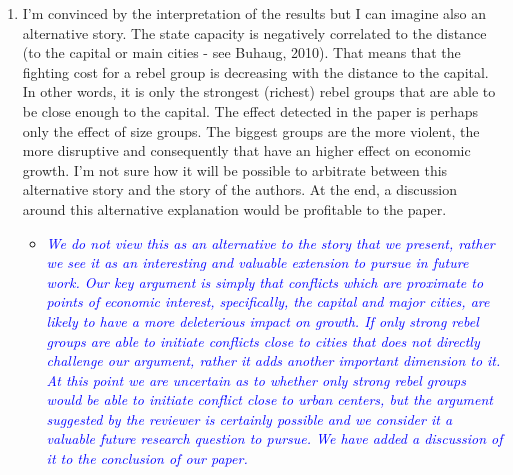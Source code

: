 \begin{enumerate}

\item  I’m convinced by the interpretation of the results but I can imagine also an alternative story. The state capacity is negatively correlated to the distance (to the capital or main cities - see Buhaug, 2010). That means that the fighting cost for a rebel group is decreasing with the distance to the capital. In other words, it is only the strongest (richest) rebel groups that are able to be close enough to the capital. The effect detected in the paper is perhaps only the effect of size groups. The biggest groups are the more violent, the more disruptive and consequently that have an higher effect on economic growth. I’m not sure how it will be possible to arbitrate between this alternative story and the story of the authors. At the end, a discussion around this alternative explanation would be profitable to the paper.

\begin{itemize}
\item \textcolor{blue}{\emph{
	We do not view this as an alternative to the story that we present, rather we see it as an interesting and valuable extension to pursue in future work. Our key argument is simply that conflicts which are proximate to points of economic interest, specifically, the capital and major cities, are likely to have a more deleterious impact on growth. If only strong rebel groups are able to initiate conflicts close to cities that does not directly challenge our argument, rather it adds another important dimension to it. At this point we are uncertain as to whether only strong rebel groups would be able to initiate conflict close to urban centers, but the argument suggested by the reviewer is certainly possible and we consider it a valuable future research question to pursue. We have added a discussion of it to the conclusion of our paper. 
}}
\end{itemize}


\end{enumerate}
